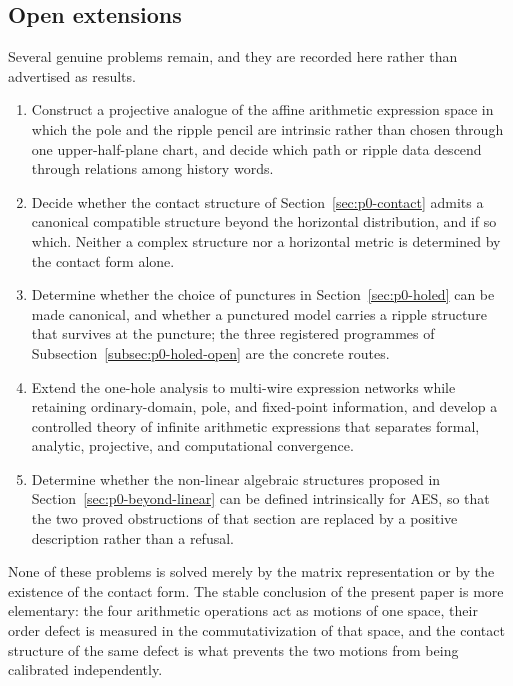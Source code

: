 \subsection{Open extensions}

Several genuine problems remain, and they are recorded here rather than
advertised as results.

\begin{enumerate}
  \item Construct a projective analogue of the affine arithmetic expression
  space in which the pole and the ripple pencil are intrinsic rather than chosen
  through one upper-half-plane chart, and decide which path or ripple data
  descend through relations among history words.

  \item Decide whether the contact structure of Section~\ref{sec:p0-contact}
  admits a canonical compatible structure beyond the horizontal distribution,
  and if so which.  Neither a complex structure nor a horizontal metric is
  determined by the contact form alone.

  \item Determine whether the choice of punctures in Section~\ref{sec:p0-holed}
  can be made canonical, and whether a punctured model carries a ripple
  structure that survives at the puncture; the three registered programmes of
  Subsection~\ref{subsec:p0-holed-open} are the concrete routes.

  \item Extend the one-hole analysis to multi-wire expression networks while
  retaining ordinary-domain, pole, and fixed-point information, and develop a
  controlled theory of infinite arithmetic expressions that separates formal,
  analytic, projective, and computational convergence.

  \item Determine whether the non-linear algebraic structures proposed in
  Section~\ref{sec:p0-beyond-linear} can be defined intrinsically for AES, so
  that the two proved obstructions of that section are replaced by a positive
  description rather than a refusal.
\end{enumerate}

None of these problems is solved merely by the matrix representation or by the
existence of the contact form.  The stable conclusion of the present paper is
more elementary: the four arithmetic operations act as motions of one space,
their order defect is measured in the commutativization of that space, and the
contact structure of the same defect is what prevents the two motions from being
calibrated independently.
